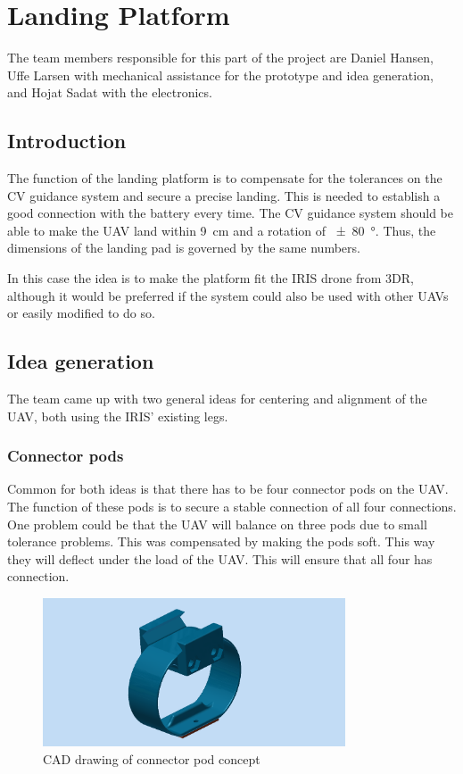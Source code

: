 \section{Landing Platform}
The team members responsible for this part of the project are Daniel Hansen, Uffe Larsen with mechanical assistance for the prototype and idea generation, and Hojat Sadat with the electronics.
\subsection{Introduction}
The function of the landing platform is to compensate for the tolerances on the CV guidance system and secure a precise landing. This is needed to establish a good connection with the battery every time. The CV guidance system should be able to make the UAV land within \SI{9}{\centi\meter} and a rotation of \SI{\pm 80}{\degree}. Thus, the dimensions of the landing pad is governed by the same numbers.

In this case the idea is to make the platform fit the IRIS drone from 3DR, although it would be preferred if the system could also be used with other UAVs or easily modified to do so.
\subsection{Idea generation}
The team came up with two general ideas for centering and alignment of the UAV, both using the IRIS' existing legs.
\subsubsection{Connector pods}
Common for both ideas is that there has to be four connector pods on the UAV. The function of these pods is to secure a stable connection of all four connections. One problem could be that the UAV will balance on three pods due to small tolerance problems. This was compensated by making the pods soft. This way they will deflect under the load of the UAV. This will ensure that all four has connection.

\begin{figure}
	\centering
	\includegraphics[width=0.8\textwidth]{imgs/connectorpod}
	\caption{CAD drawing of connector pod concept}
\end{figure}

